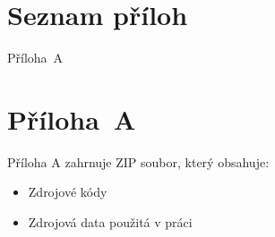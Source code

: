 \documentclass[a4paper, 12pt]{article}
\begin{document}

\clearpage {} {}
\section*{Seznam příloh}

\noindent Příloha~A \dotfill \pageref{1}


\clearpage {}\label{prilohaA} 
\section*{Příloha~A}

Příloha A zahrnuje ZIP soubor, který obsahuje: 

\begin{itemize}
    \item Zdrojové kódy
    \item Zdrojová data použitá v práci
\end{itemize}

\end{document}
